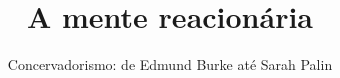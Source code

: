 \documentclass{novel}
\title     {A mente reacionária}
\subtitle  {Concervadorismo: de Edmund Burke até Sarah Palin}
\begin{document}
\toc



\end{document}
